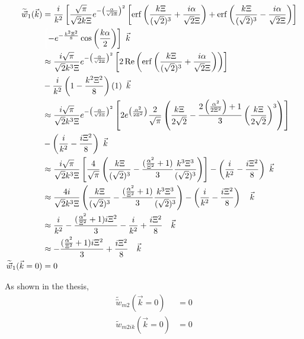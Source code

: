 \documentclass[double,12pt]{revtex4-2}
\begin{document}
\begin{align}
   \widetilde{\vec{w}}_1(\vec{k}) &= \frac{i}{k^2}\left[\frac{\sqrt{\pi}}
   {\sqrt{2}k\Xi}
   e^{-\left(\frac{\alpha}{\sqrt{2}\Xi}\right)^2}\left[\operatorname{erf}
   \left(\frac{k\Xi}{(\sqrt{2})^3}+\frac{i\alpha}{\sqrt{2}\Xi}\right)
   +\operatorname{erf}\left(\frac{k\Xi}{(\sqrt{2})^3}-\frac{i\alpha}
   {\sqrt{2}\Xi}
   \right)\right]\color{white}\right]\color{black}  \nonumber \\
 & \color{white}\left[\color{black}-e^{-\frac{k^2\Xi^2}{8}}\cos\left(
    \frac{k\alpha}{2}\right)\right]{~}\color{black}\vec{k} \\
    & \approx  \frac{i\sqrt{\pi}}{\sqrt{2}k^3\Xi}e^{-\left(\frac{\alpha}
    {\sqrt{2}\Xi}\right)^2}\left[2\operatorname{Re}\left(\operatorname{erf}
    \left(\frac{k\Xi}{(\sqrt{2})^3}+\frac{i\alpha}{\sqrt{2}\Xi}\right)
    \right)\right] \nonumber \\
    &-\frac{i}{k^2}\left(1-\frac{k^2\Xi^2}{8}\right)\left(1\right) 
    {~}\vec{k} \\
    & \approx  \frac{i\sqrt{\pi}}{\sqrt{2}k^3\Xi}e^{-\left(\frac{\alpha}
    {\sqrt{2}\Xi}\right)^2}\left[2e^{\left(\frac{\alpha^2}{2\Xi^2}\right)}
    \frac{2}{\sqrt{\pi}}   \left(\frac{k\Xi}{2\sqrt{2}}   -\frac{2\left(
    \frac{\alpha^2}{2\Xi^2}\right)+1}{3}\left(\frac{k\Xi}{2\sqrt{2}}
    \right)^3\right)\right] \nonumber \\
    &-\left(\frac{i}{k^2}-\frac{i\Xi^2}{8}\right) {~}\vec{k}\\
    & \approx  \frac{i\sqrt{\pi}}{\sqrt{2}k^3\Xi}\left[\frac{4}{\sqrt{\pi}}
    \left(\frac{k\Xi}{(\sqrt{2})^3} -\frac{(\frac{\alpha^2}{\Xi^2}+1)}{3}
    \frac{k^3\Xi^3}{(\sqrt{2})^3}\right)\right] -\left(\frac{i}{k^2}
    -\frac{i\Xi^2}{8}\right) {~}\vec{k}\\
    & \approx  \frac{4i}{\sqrt{2}k^3\Xi}\left(\frac{k\Xi}{(\sqrt{2})^3} 
    -\frac{(\frac{\alpha^2}{\Xi^2}+1)}{3}\frac{k^3\Xi^3}{(\sqrt{2})^3}
    \right)-\left(\frac{i}{k^2}-\frac{i\Xi^2}{8}\right) {~~~}\vec{k}\\
    & \approx  \frac{i}{k^2} -\frac{(\frac{\alpha^2}{\Xi^2}+1)i\Xi^2}{3}
    -\frac{i}{k^2}+\frac{i\Xi^2}{8} {~~~}\vec{k}\\
    & \approx  -\frac{(\frac{\alpha^2}{\Xi^2}+1)i\Xi^2}{3}
    +\frac{i\Xi^2}{8} {~~~}\vec{k}\\
     \widetilde{\vec w}_1(\vec k=0) &= 0 
\end{align}

As shown in the thesis,
\begin{align}
  \widetilde{\overleftrightarrow w}_{m2}(\vec k=0) &= 0  \\
  \widetilde w_{m2ik}(\vec k = 0) &= 0
\end{align}
\end{document}
